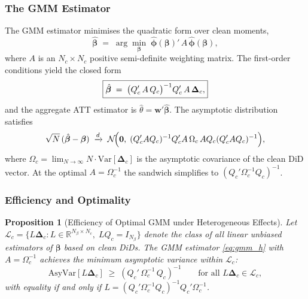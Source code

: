\documentclass[12pt,letterpaper]{article}
\newtheorem{proposition}[theorem]{Proposition}
\theoremstyle{remark}
\theoremstyle{definition}
\begin{document}
\subsubsection{The GMM Estimator}
\label{sec:gmm_hetero_estimator}

The GMM estimator minimises the quadratic form over clean moments,
\begin{equation}
  \hat{\boldsymbol{\beta}}
  \;=\;
  \arg\min_{\boldsymbol{\beta}}\;
  \hat{\boldsymbol{\phi}}(\boldsymbol{\beta})'\,A\,
  \hat{\boldsymbol{\phi}}(\boldsymbol{\beta}),
  \label{eq:gmm_h_obj}
\end{equation}
where $A$ is an $N_c\times N_c$ positive semi-definite weighting matrix.
The first-order conditions yield the closed form
\begin{equation}
  \boxed{%
    \hat{\boldsymbol{\beta}}
    \;=\;
    \bigl(Q_c'\,A\,Q_c\bigr)^{-1}Q_c'\,A\,\boldsymbol{\Delta}_c,
  }
  \label{eq:gmm_h}
\end{equation}
and the aggregate ATT estimator is $\hat{\theta}=\mathbf{w}'\hat{\boldsymbol{\beta}}$.
The asymptotic distribution satisfies
\begin{equation}
  \sqrt{N}\,(\hat{\boldsymbol{\beta}}-\boldsymbol{\beta})
  \;\xrightarrow{d}\;
  \mathcal{N}\!\Bigl(
    \mathbf{0},\;
    (Q_c'AQ_c)^{-1}Q_c'A\,\Omega_c\,AQ_c(Q_c'AQ_c)^{-1}
  \Bigr),
  \label{eq:asy_h}
\end{equation}
where $\Omega_c=\lim_{N\to\infty}N\cdot\mathrm{Var}[\boldsymbol{\Delta}_c]$
is the asymptotic covariance of the clean DiD vector. At the optimal
$A=\Omega_c^{-1}$ the sandwich simplifies to $(Q_c'\Omega_c^{-1}Q_c)^{-1}$.

\subsubsection{Efficiency and Optimality}
\label{sec:gmm_hetero_efficiency}

\begin{proposition}[Efficiency of Optimal GMM under Heterogeneous Effects]
  \label{prop:gmm_hetero_opt}
  Let $\mathcal{L}_c=\{L\boldsymbol{\Delta}_c: L\in\mathbb{R}^{N_\beta\times
  N_c},\; LQ_c=I_{N_\beta}\}$ denote the class of all linear unbiased
  estimators of $\boldsymbol{\beta}$ based on clean DiDs. The GMM estimator
  \eqref{eq:gmm_h} with $A=\Omega_c^{-1}$ achieves the minimum asymptotic
  variance within $\mathcal{L}_c$:
  \[
    \mathrm{AsyVar}[L\boldsymbol{\Delta}_c]
    \;\geq\;
    (Q_c'\,\Omega_c^{-1}\,Q_c)^{-1}
    \qquad\text{for all }L\boldsymbol{\Delta}_c\in\mathcal{L}_c,
  \]
  with equality if and only if
  $L=(Q_c'\Omega_c^{-1}Q_c)^{-1}Q_c'\Omega_c^{-1}$.
\end{proposition}
\end{document}
